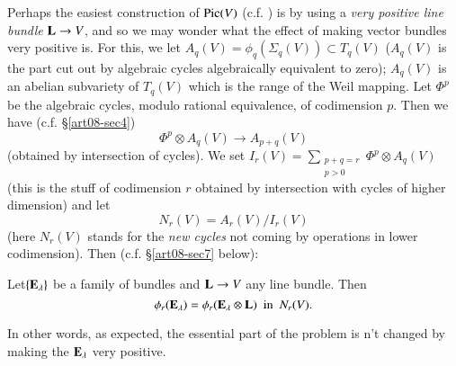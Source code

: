 \begin{example}\label{art08-sec6-exam4}
Perhaps the easiest construction of $\operatorname{\mathrm{Pic}}(V)$ (c.f. \cite{art08-key18}) is by using a {\em very positive line bundle} $\mathbf{L}\to V$, and so we may wonder what the effect of making vector bundles very positive is. For this, we let $A_{q}(V)=\phi_{q}(\Sigma_{q}(V))\subset T_{q}(V)$ ($A_{q}(V)$ is the part cut out by algebraic cycles algebraically equivalent to zero); $A_{q}(V)$ is an abelian subvariety of $T_{q}(V)$ which is the range of the Weil mapping. Let $\Phi^{p}$ be the algebraic cycles, modulo rational equivalence, of codimension $p$. Then we have (c.f. \S\ref{art08-sec4})
\begin{equation}
\Phi^{p}\otimes A_{q}(V)\to A_{p+q}(V)\label{art08-sec6-eq6.11}
\end{equation}
(obtained by intersection of cycles). We set $I_{r}(V)=\sum\limits_{\substack{p+q=r\\ p>0}}\Phi^{p}\otimes A_{q}(V)$ (this is the stuff of codimension $r$ obtained by intersection with cycles of higher dimension) and let
\begin{equation}
N_{r}(V)=A_{r}(V)/I_{r}(V)\label{art08-sec6-eq6.12}
\end{equation}
(here $N_{r}(V)$ stands for the {\em new cycles} not coming by operations in lower codimension). Then (c.f. \S\ref{art08-sec7} below):
\end{example}

Let\pageoriginale $\{\mathbf{E}_{\lambda}\}$ be a family of bundles and $\mathbf{L}\to V$ any line bundle. Then 
\begin{equation}
\phi_{r}(\mathbf{E}_{\lambda})=\phi_{r}(\mathbf{E}_{\lambda}\otimes \mathbf{L})\text{~ in~ } N_{r}(V).\label{art08-sec6-eq6.13}
\end{equation}

In other words, as expected, the essential part of the problem is n't changed by making the $\mathbf{E}_{\lambda}$ very positive.

